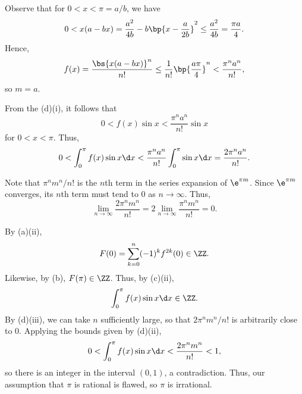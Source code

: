 \begin{solution}
\begin{ppart}
\begin{psubpart}
        \end{psubpart}
    \end{ppart}
    \begin{ppart}
        \begin{psubpart}
            Observe that for $0 < x < \pi = a/b$, we have \[0 < x(a-bx) = \frac{a^2}{4b} - b\bp{x - \frac{a}{2b}}^2 \leq \frac{a^2}{4b} = \frac{\pi a}{4}.\] Hence, \[f(x) = \frac{\bs{x(a-bx)}^n}{n!} \leq \frac1{n!} \bp{\frac{a\pi}{4}}^n < \frac{\pi^n a^n}{n!},\] so $m = a$.
        \end{psubpart}
        \begin{psubpart}
            From the (d)(i), it follows that \[0 < f(x) \sin x < \frac{\pi^n a^n}{n!} \sin x\] for $0 < x < \pi$. Thus, \[0 < \int_0^\pi f(x) \sin x \d x < \frac{\pi^n a^n}{n!} \int_0^\pi \sin x \d x = \frac{2\pi^n a^n}{n!}.\]
        \end{psubpart}
        \begin{psubpart}
            Note that $\pi^n m^n / n!$ is the $n$th term in the series expansion of $\e^{\pi m}$. Since $\e^{\pi m}$ converges, its $n$th term must tend to 0 as $n \to \infty$. Thus, \[\lim_{n \to \infty} \frac{2\pi^n m^n}{n!}  = 2\lim_{n \to \infty} \frac{\pi^n m^n}{n!} = 0.\]
        \end{psubpart}
    \end{ppart}
    \begin{ppart}
        By (a)(ii), \[F(0) = \sum_{k = 0}^n (-1)^k f^{2k}(0) \in \ZZ.\] Likewise, by (b), $F(\pi) \in \ZZ$. Thus, by (c)(ii), \[\int_0^\pi f(x) \sin x \d x \in \ZZ.\] By (d)(iii), we can take $n$ sufficiently large, so that $2\pi^n m^n/n!$ is arbitrarily close to 0. Applying the bounds given by (d)(ii), \[0 < \int_0^\pi f(x) \sin x \d x < \frac{2\pi^n m^n}{n!} < 1,\] so there is an integer in the interval $(0, 1)$, a contradiction. Thus, our assumption that $\pi$ is rational is flawed, so $\pi$ is irrational.
    \end{ppart}
\end{solution}